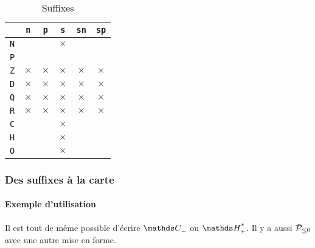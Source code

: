 \documentclass[12pt,a4paper]{article}
\theoremstyle{definition}
\begin{document}

\newcommand\xx{\phantom{$\times$}}
\begin{table}[h]
    \caption{Suffixes}
    \begin{center}
        \begin{tabular}{c|c|c|c|c|c}
              & \verb+n+ & \verb+p+ & \verb+s+ & \verb+sn+ & \verb+sp+ \\
            \hline \verb+N+ & \xx & \xx & $\times$ & \xx & \xx \\
            \hline \verb+P+ & \xx & \xx & \xx & \xx & \xx \\
            \hline \verb+Z+ & $\times$ & $\times$ & $\times$ & $\times$ & $\times$ \\
            \hline \verb+D+ & $\times$ & $\times$ & $\times$ & $\times$ & $\times$ \\
            \hline \verb+Q+ & $\times$ & $\times$ & $\times$ & $\times$ & $\times$ \\
            \hline \verb+R+ & $\times$ & $\times$ & $\times$ & $\times$ & $\times$ \\
            \hline \verb+C+ & \xx & \xx & $\times$ & \xx & \xx \\
            \hline \verb+H+ & \xx & \xx & $\times$ & \xx & \xx \\
            \hline \verb+O+ & \xx & \xx & $\times$ & \xx & \xx \\
        \end{tabular}
    \end{center}
    \label{table:suffixes-sets}
\end{table}




        \subsubsection{Des suffixes à la carte}

            \paragraph{Exemple d'utilisation}

\begin{tcblisting}{}
Il est tout de même possible d'écrire $\specialset{\CC}{n}$ ou $\specialset{\HH}{sp}$.
Il y a aussi $\specialset*{\probaset{P}}{n}$ avec une autre mise en forme.
\end{tcblisting}
\end{document}
